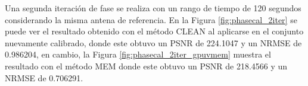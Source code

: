 Una segunda iteración de fase se realiza con un rango de tiempo de 120 segundos considerando la misma antena de referencia. En la Figura \ref{fig:phasecal_2iter} se puede ver el resultado obtenido con el método CLEAN al aplicarse en el conjunto nuevamente calibrado, donde este obtuvo un PSNR de 224.1047 y un NRMSE de 0.986204, en cambio, la Figura \ref{fig:phasecal_2iter_gpuvmem} muestra el resultado con el método MEM donde este obtuvo un PSNR de 218.4566 y un NRMSE de 0.706291. 

\begin{figure}[!ht]
 \centering
    \vspace{0.3cm}
\end{figure}
